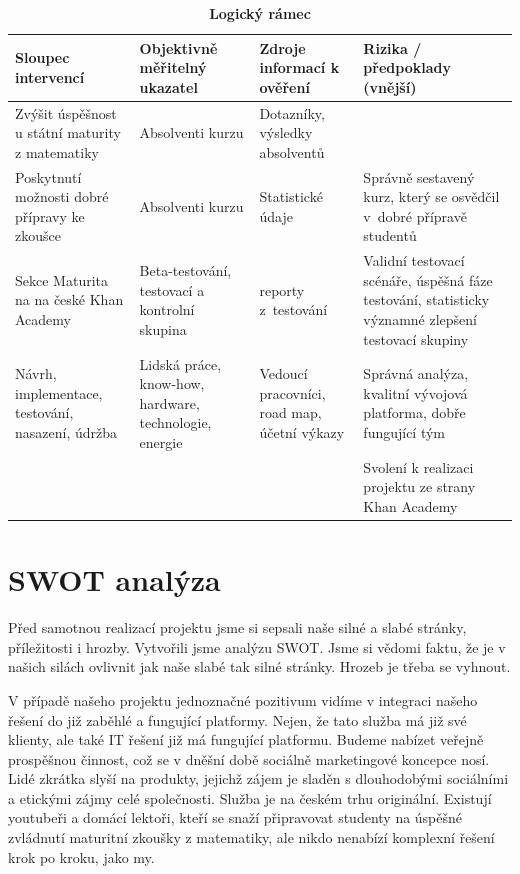 \documentclass[12pt, a4paper]{report}
\begin{document}
\begin{table}[htbp]
\caption{\textbf{Logický rámec}}
\centering
\footnotesize
\begin{tabularx}{\textwidth}{|X|X|X|X|}
\hline
Sloupec intervencí & Objektivně měřitelný ukazatel & Zdroje informací k ověření & Rizika / předpoklady (vnější)\\
\hline
Zvýšit úspěšnost u státní maturity z matematiky & Absolventi kurzu & Dotazníky, výsledky absolventů & \\
\hline
Poskytnutí možnosti dobré přípravy ke zkoušce & Absolventi kurzu & Statistické údaje & Správně sestavený kurz, který se osvědčil v dobré přípravě studentů\\
\hline
Sekce Maturita na na české Khan Academy & Beta-testování, testovací a  kontrolní skupina & reporty z testování & Validní testovací scénáře, úspěšná fáze testování, statisticky významné zlepšení testovací skupiny\\
\hline
Návrh, implementace, testování, nasazení, údržba & Lidská práce, know-how, hardware, technologie, energie & Vedoucí pracovníci, road map, účetní výkazy & Správná analýza, kvalitní vývojová platforma, dobře fungující tým\\
\hline
 &  &  & Svolení k realizaci projektu ze strany Khan Academy\\
\hline
\end{tabularx}
\end{table}

\chapter{SWOT analýza}
\label{sec:org455a7dc}
Před samotnou realizací projektu jsme si sepsali naše silné a slabé stránky, příležitosti i hrozby. Vytvořili jsme analýzu SWOT. Jsme si vědomi faktu, že je v našich silách ovlivnit jak naše slabé tak silné stránky. Hrozeb je třeba se vyhnout.

V případě našeho projektu jednoznačné pozitivum vidíme v integraci našeho řešení do již zaběhlé a fungující platformy. Nejen, že tato služba má již své klienty, ale také IT řešení již má fungující platformu. Budeme nabízet veřejně prospěšnou činnost, což se v dněšní době sociálně marketingové koncepce nosí. Lidé zkrátka slyší na produkty, jejichž zájem je sladěn s dlouho\-dobými sociálními a etickými zájmy celé společnosti. Služba je na českém trhu originální. Existují youtubeři a domácí lektoři, kteří se snaží připravovat studenty na úspěšné zvládnutí maturitní zkoušky z matematiky, ale nikdo nenabízí komplexní řešení krok po kroku, jako my.
\end{document}

